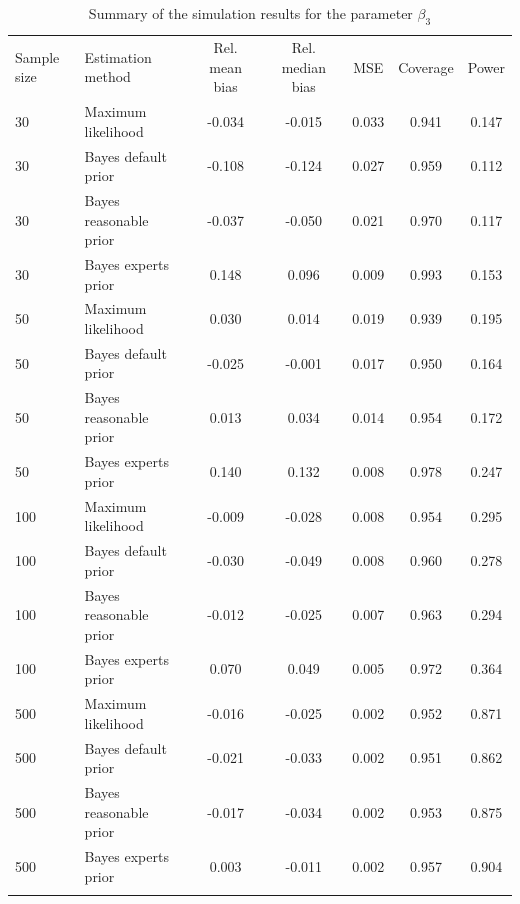\documentclass[graybox]{svmult}
\begin{document}
\begin{table}
\caption{Summary of the simulation results for the parameter $\beta_3$}
\begin{tabular}[t]{llccccc}
\hline\noalign{\smallskip}
Sample size & Estimation method & Rel. mean bias & Rel. median bias & MSE & Coverage & Power\\
\noalign{\smallskip}\svhline\noalign{\smallskip}
30 & Maximum likelihood & -0.034 & -0.015 & 0.033 & 0.941 & 0.147\\
30 & Bayes default prior & -0.108 & -0.124 & 0.027 & 0.959 & 0.112\\
30 & Bayes reasonable prior & -0.037 & -0.050 & 0.021 & 0.970 & 0.117\\
30 & Bayes experts prior & 0.148 & 0.096 & 0.009 & 0.993 & 0.153\\
\noalign{\smallskip}
50 & Maximum likelihood & 0.030 & 0.014 & 0.019 & 0.939 & 0.195\\
50 & Bayes default prior & -0.025 & -0.001 & 0.017 & 0.950 & 0.164\\
50 & Bayes reasonable prior & 0.013 & 0.034 & 0.014 & 0.954 & 0.172\\
50 & Bayes experts prior & 0.140 & 0.132 & 0.008 & 0.978 & 0.247\\
\noalign{\smallskip}
100 & Maximum likelihood & -0.009 & -0.028 & 0.008 & 0.954 & 0.295\\
100 & Bayes default prior & -0.030 & -0.049 & 0.008 & 0.960 & 0.278\\
100 & Bayes reasonable prior & -0.012 & -0.025 & 0.007 & 0.963 & 0.294\\
100 & Bayes experts prior & 0.070 & 0.049 & 0.005 & 0.972 & 0.364\\
\noalign{\smallskip}
500 & Maximum likelihood & -0.016 & -0.025 & 0.002 & 0.952 & 0.871\\
500 & Bayes default prior & -0.021 & -0.033 & 0.002 & 0.951 & 0.862\\
500 & Bayes reasonable prior & -0.017 & -0.034 & 0.002 & 0.953 & 0.875\\
500 & Bayes experts prior & 0.003 & -0.011 & 0.002 & 0.957 & 0.904\\
\noalign{\smallskip}\hline\noalign{\smallskip}
\end{tabular}
\end{table}

\clearpage





%
\end{document}

